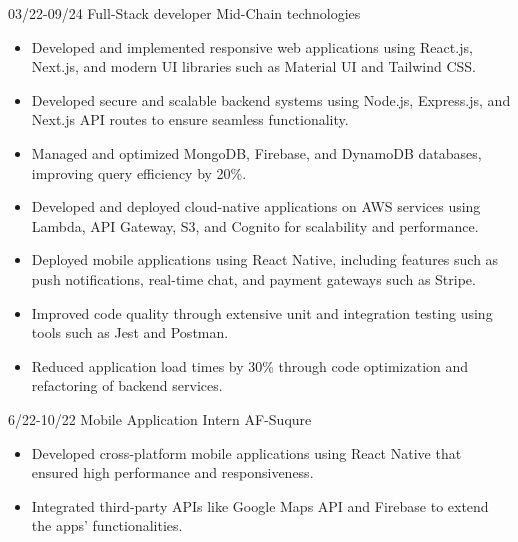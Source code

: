 \documentclass[9pt]{developercv}
\begin{document}
\vspace{-10 pt}
\begin{entrylist}
   \entry
   {03/22-09/24}
   {Full-Stack developer}
   {Mid-Chain technologies}
   {\vspace{-10pt}
      \begin{itemize}[noitemsep,topsep=0pt,parsep=0pt,partopsep=0pt, leftmargin=-1pt]
         \item {Developed and implemented responsive web applications using React.js, Next.js, and modern UI libraries such as Material UI and Tailwind CSS.}
         \item {Developed secure and scalable backend systems using Node.js, Express.js, and Next.js API routes to ensure seamless functionality.}
         \item {Managed and optimized MongoDB, Firebase, and DynamoDB databases, improving query efficiency by 20\%.}
         \item {Developed and deployed cloud-native applications on AWS services using Lambda, API Gateway, S3, and Cognito for scalability and performance.}
         \item {Deployed mobile applications using React Native, including features such as push notifications, real-time chat, and payment gateways such as Stripe.}
         \item {Improved code quality through extensive unit and integration testing using tools such as Jest and Postman.}

         \item {Reduced application load times by 30\% through code optimization and refactoring of backend services.}

      \end{itemize}
   }
   \entry
   {6/22-10/22}
   {Mobile Application Intern}
   {AF-Suqure}
   {\vspace{-10pt}
      \begin{itemize}[noitemsep,topsep=0pt,parsep=0pt,partopsep=0pt, leftmargin=-1pt]
         \item {Developed cross-platform mobile applications using React Native that ensured high performance and responsiveness.}

         \item {Integrated third-party APIs like Google Maps API and Firebase to extend the apps’ functionalities.}


\end{itemize}}
\end{entrylist}
\end{document}
